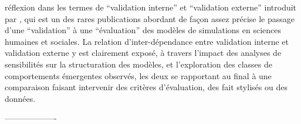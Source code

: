 réflexion dans les termes de \enquote{validation interne} et \enquote{validation externe} introduit par \autocite{Amblard2006}, qui est un des rares publications abordant de façon assez précise le passage d'une \enquote{validation} à une \enquote{évaluation} des modèles de simulations en sciences humaines et sociales. La relation d'inter-dépendance entre validation interne et validation externe y est clairement exposé, à travers l'impact des analyses de sensibilités sur la structuration des modèles, et l'exploration des classes de comportements émergentes observés, les deux se rapportant au final à une comparaison faisant intervenir des critères d'évaluation, des fait stylisés ou des données.


-------------------
